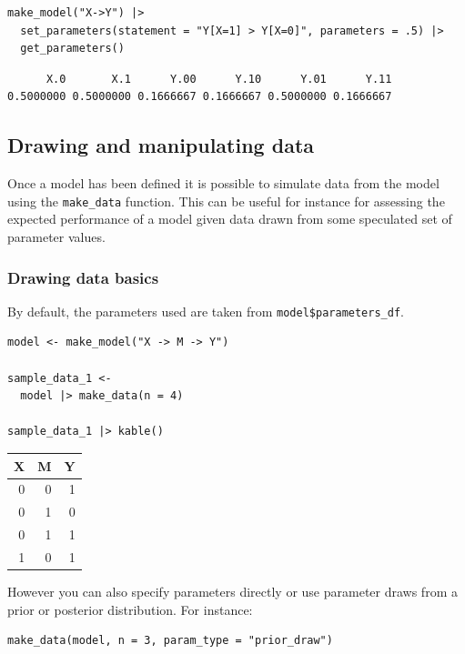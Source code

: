 \documentclass[
  article]{jss}
\begin{document}
\begin{verbatim}
make_model("X->Y") |>
  set_parameters(statement = "Y[X=1] > Y[X=0]", parameters = .5) |>
  get_parameters()
\end{verbatim}

\begin{verbatim}
      X.0       X.1      Y.00      Y.10      Y.01      Y.11 
0.5000000 0.5000000 0.1666667 0.1666667 0.5000000 0.1666667 
\end{verbatim}

\hypertarget{drawing-and-manipulating-data}{%
\subsection{Drawing and manipulating
data}\label{drawing-and-manipulating-data}}

Once a model has been defined it is possible to simulate data from the
model using the \texttt{make\_data} function. This can be useful for
instance for assessing the expected performance of a model given data
drawn from some speculated set of parameter values.

\hypertarget{drawing-data-basics}{%
\subsubsection{Drawing data basics}\label{drawing-data-basics}}

By default, the parameters used are taken from
\texttt{model\$parameters\_df}.

\begin{verbatim}
model <- make_model("X -> M -> Y")

sample_data_1 <- 
  model |> make_data(n = 4) 

sample_data_1 |> kable()
\end{verbatim}

\begin{longtable}[]{@{}rrr@{}}
\toprule()
X & M & Y \\
\midrule()
\endhead
0 & 0 & 1 \\
0 & 1 & 0 \\
0 & 1 & 1 \\
1 & 0 & 1 \\
\bottomrule()
\end{longtable}

However you can also specify parameters directly or use parameter draws
from a prior or posterior distribution. For instance:

\begin{verbatim}
make_data(model, n = 3, param_type = "prior_draw")
\end{verbatim}
\end{document}
